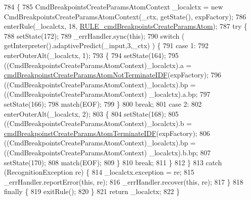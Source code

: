 \begin{DoxyCode}
784                                                                                                            
                                         \{
785     CmdBreakpointsCreateParamsAtomContext \_localctx = \textcolor{keyword}{new} CmdBreakpointsCreateParamsAtomContext(\_ctx, 
      getState(), expFactory);
786     enterRule(\_localctx, 18, \hyperlink{classgov_1_1nasa_1_1jpf_1_1inspector_1_1server_1_1expression_1_1parser_1_1_expression_grammar_parser_ad0c8fc596b444f6cd7d58fab3d7f28d2}{RULE\_cmdBreakpointsCreateParamsAtom});
787     \textcolor{keywordflow}{try} \{
788       setState(172);
789       \_errHandler.sync(\textcolor{keyword}{this});
790       \textcolor{keywordflow}{switch} ( getInterpreter().adaptivePredict(\_input,3,\_ctx) ) \{
791       \textcolor{keywordflow}{case} 1:
792         enterOuterAlt(\_localctx, 1);
793         \{
794         setState(164);
795         ((CmdBreakpointsCreateParamsAtomContext)\_localctx).a = 
      \hyperlink{classgov_1_1nasa_1_1jpf_1_1inspector_1_1server_1_1expression_1_1parser_1_1_expression_grammar_parser_a877ec76515f792b811174f247de762a6}{cmdBreakpoinstCreateParamsAtomNotTerminateIDF}(expFactory);
796          ((CmdBreakpointsCreateParamsAtomContext)\_localctx).bp =  ((CmdBreakpointsCreateParamsAtomContext)
      \_localctx).a.bp; 
797         setState(166);
798         match(EOF);
799         \}
800         \textcolor{keywordflow}{break};
801       \textcolor{keywordflow}{case} 2:
802         enterOuterAlt(\_localctx, 2);
803         \{
804         setState(168);
805         ((CmdBreakpointsCreateParamsAtomContext)\_localctx).b = 
      \hyperlink{classgov_1_1nasa_1_1jpf_1_1inspector_1_1server_1_1expression_1_1parser_1_1_expression_grammar_parser_a67979d89277e44ddae7fa8ab4a4d8cfb}{cmdBreakpoinstCreateParamsAtomTerminateIDF}(expFactory);
806          ((CmdBreakpointsCreateParamsAtomContext)\_localctx).bp =  ((CmdBreakpointsCreateParamsAtomContext)
      \_localctx).b.bp; 
807         setState(170);
808         match(EOF);
809         \}
810         \textcolor{keywordflow}{break};
811       \}
812     \}
813     \textcolor{keywordflow}{catch} (RecognitionException re) \{
814       \_localctx.exception = re;
815       \_errHandler.reportError(\textcolor{keyword}{this}, re);
816       \_errHandler.recover(\textcolor{keyword}{this}, re);
817     \}
818     \textcolor{keywordflow}{finally} \{
819       exitRule();
820     \}
821     \textcolor{keywordflow}{return} \_localctx;
822   \}
\end{DoxyCode}
